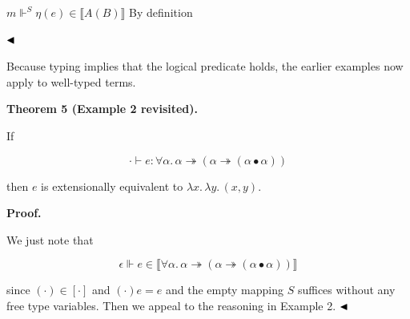 \documentclass[10pt,a4paper]{amsart}
\begin{document}
\par   $m\Vdash^{S}\eta(e)\in\llbracket A(B)\rrbracket$ By definition\quad  
  
   
$\hfill\blacktriangleleft$\par
 

 
Because typing implies that the logical predicate holds, the earlier examples now apply to well-typed terms.\par
 
 
 
\par\medskip\noindent\textbf{Theorem 5 (Example 2 revisited).}\par
 
 
If\par
  
\par  \quad  \[\cdot\vdash e:\forall\alpha.\,\alpha\twoheadrightarrow(\alpha\twoheadrightarrow(\alpha\bullet\alpha))\]\quad  \quad  
  
then $e$ is extensionally equivalent to $\lambda x.\,\lambda y.\,(x,y)$.\par
 
 
 
 
 
\par\medskip\noindent\textbf{Proof.}\par
 
 
We just note that\par
  
\par  \quad  \[\epsilon\Vdash e\in\llbracket\forall\alpha.\,\alpha\twoheadrightarrow(\alpha\twoheadrightarrow(\alpha\bullet\alpha))\rrbracket\]\quad  \quad  
  
since $(\cdot)\in[\cdot]$ and $(\cdot)e=e$ and the empty mapping $S$ suffices without any free type variables. Then we appeal to the reasoning in Example 2. $\hfill\blacktriangleleft$\par
 
\end{document}
